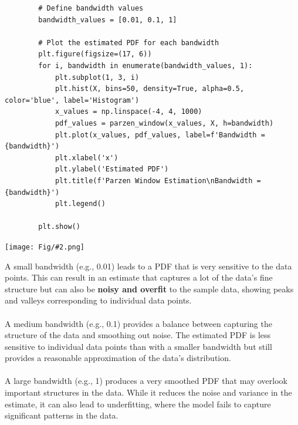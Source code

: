 \documentclass[]{article}
\newcommand{\pict}[2]{\begin{center}
		\texttt{[image: Fig/\#2.png]}
\end{center}}
\begin{document}
	\begin{lstlisting}
		# Define bandwidth values
		bandwidth_values = [0.01, 0.1, 1]
		
		# Plot the estimated PDF for each bandwidth
		plt.figure(figsize=(17, 6))
		for i, bandwidth in enumerate(bandwidth_values, 1):
			plt.subplot(1, 3, i)
			plt.hist(X, bins=50, density=True, alpha=0.5, color='blue', label='Histogram')
			x_values = np.linspace(-4, 4, 1000)
			pdf_values = parzen_window(x_values, X, h=bandwidth)
			plt.plot(x_values, pdf_values, label=f'Bandwidth = {bandwidth}')
			plt.xlabel('x')
			plt.ylabel('Estimated PDF')
			plt.title(f'Parzen Window Estimation\nBandwidth = {bandwidth}')
			plt.legend()
		
		plt.show()
	\end{lstlisting}
	\pict{1}{F7}
	A small bandwidth (e.g., 0.01) leads to a PDF that is very sensitive to the data points. This can result in an estimate that captures a lot of the data’s fine structure but can also be \textbf{noisy and overfit} to the sample data, showing peaks and valleys corresponding to individual data points.\\\\
	A medium bandwidth (e.g., 0.1) provides a balance between capturing the structure of the data and smoothing out noise. The estimated PDF is less sensitive to individual data points than with a smaller bandwidth but still provides a reasonable approximation of the data’s distribution.\\\\
	A large bandwidth (e.g., 1) produces a very smoothed PDF that may overlook important structures in the data. While it reduces the noise and variance in the estimate, it can also lead to underfitting, where the model fails to capture significant patterns in the data.
\end{document}
